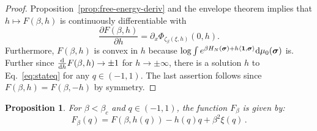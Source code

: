 \documentclass[11pt]{article}
\newtheorem{proposition}[theorem]{Proposition}
\theoremstyle{definition}
\numberwithin{equation}{section}
\newcommand{\<}{\langle}
\renewcommand{\>}{\rangle}
\def\bsigma{{\boldsymbol{\sigma}}}
\def\de{{\rm d}}
\def\bsig{{\boldsymbol {\sigma}}}
\begin{document}
\begin{proof}
Proposition~\ref{prop:free-energy-deriv} and the envelope theorem \cite{milgrom2002envelope} implies that $h\mapsto F(\beta,h)$ is continuously differentiable with 
\[
\frac{\partial F(\beta,h)}{\partial h}
=
\partial_x \Phi_{\zeta_{\beta}(\xi,h)}(0,h).
\]
Furthermore, $F(\beta,h)$ is convex in $h$ because $\log \int e^{\beta H_N(\bsigma) + h\langle \mathbf{1} , \bsigma \rangle} \de\mu_0(\bsig)$ is.
Further since $\frac{\de}{\de h} F(\beta,h)\to \pm 1$ for $h \to \pm \infty$, there is a solution $h$ to Eq.~\eqref{eq:stateq} for any $q \in (-1,1)$. 
The last assertion follows since $F(\beta,h)=F(\beta,-h)$ by symmetry.
\end{proof}

\begin{proposition}\label{prop:fp_ising}
For $\beta < \beta_c$ and $q \in (-1,1)$, the function $F_{\beta}$ is 
given by:
\[
F_{\beta}(q) = F(\beta,h(q)) - h(q)q + \beta^2 \xi(q) \, .
\]
\end{proposition}
 
\end{document}
